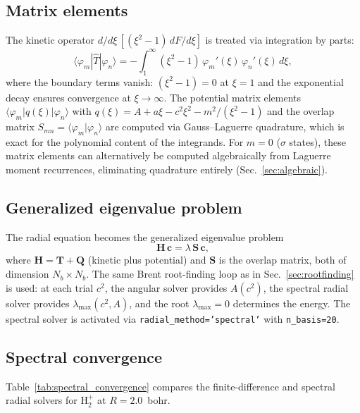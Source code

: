 \documentclass[aps,pra,twocolumn,superscriptaddress,longbibliography]{revtex4-2}
\begin{document}
\subsection{Matrix elements}

The kinetic operator $d/d\xi\,[(\xi^2 - 1)\,dF/d\xi]$ is treated
via integration by parts:
\begin{equation}
  \langle \varphi_m | \hat{T} | \varphi_n \rangle
  = -\int_1^\infty (\xi^2 - 1)\,\varphi_m'(\xi)\,\varphi_n'(\xi)\,d\xi,
  \label{eq:ibp}
\end{equation}
where the boundary terms vanish: $(\xi^2 - 1) = 0$ at $\xi = 1$
and the exponential decay ensures convergence at $\xi \to \infty$.
The potential matrix elements
$\langle \varphi_m | q(\xi) | \varphi_n \rangle$ with
$q(\xi) = A + a\xi - c^2\xi^2 - m^2/(\xi^2 - 1)$ and the overlap
matrix $S_{mn} = \langle \varphi_m | \varphi_n \rangle$ are computed
via Gauss--Laguerre quadrature, which is exact for the polynomial
content of the integrands.  For $m = 0$ ($\sigma$ states), these
matrix elements can alternatively be computed algebraically from
Laguerre moment recurrences, eliminating quadrature entirely
(Sec.~\ref{sec:algebraic}).

\subsection{Generalized eigenvalue problem}

The radial equation becomes the generalized eigenvalue problem
\begin{equation}
  \mathbf{H}\,\mathbf{c} = \lambda\,\mathbf{S}\,\mathbf{c},
  \label{eq:gep}
\end{equation}
where $\mathbf{H} = \mathbf{T} + \mathbf{Q}$ (kinetic plus potential)
and $\mathbf{S}$ is the overlap matrix, both of dimension
$N_b \times N_b$.  The same Brent root-finding loop as in
Sec.~\ref{sec:rootfinding} is used: at each trial $c^2$, the angular
solver provides $A(c^2)$, the spectral radial solver provides
$\lambda_{\max}(c^2, A)$, and the root $\lambda_{\max} = 0$
determines the energy.  The spectral solver is activated via
\texttt{radial\_method='spectral'} with \texttt{n\_basis=20}.

\subsection{Spectral convergence}

Table~\ref{tab:spectral_convergence} compares the finite-difference
and spectral radial solvers for H$_2^+$ at $R = 2.0$~bohr.
\end{document}
